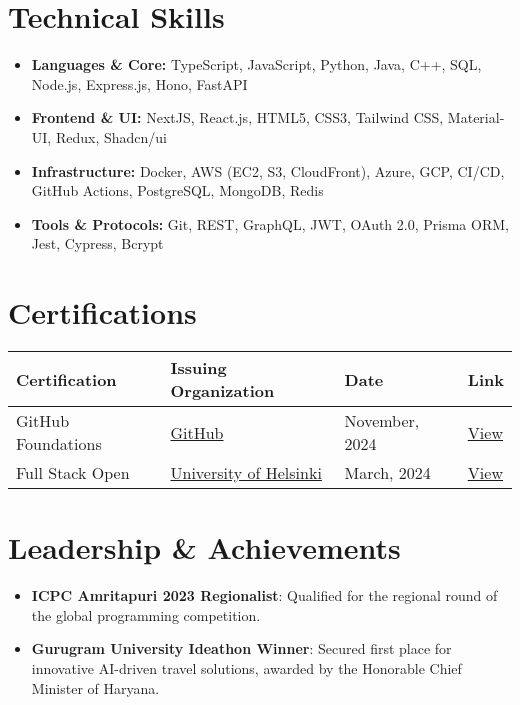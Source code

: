 \documentclass[letterpaper,11pt]{article}
\begin{document}
\section{Technical Skills}
\begin{itemize}[leftmargin=*,itemsep=0pt,parsep=0pt,topsep=0pt,partopsep=0pt]
	\item \textbf{Languages \& Core:} TypeScript, JavaScript, Python, Java, C++, SQL, Node.js, Express.js, Hono, FastAPI
	\item \textbf{Frontend \& UI:} NextJS, React.js, HTML5, CSS3, Tailwind CSS, Material-UI, Redux, Shadcn/ui
	\item \textbf{Infrastructure:} Docker, AWS (EC2, S3, CloudFront), Azure, GCP, CI/CD, GitHub Actions, PostgreSQL, MongoDB, Redis
	\item \textbf{Tools \& Protocols:} Git, REST, GraphQL, JWT, OAuth 2.0, Prisma ORM, Jest, Cypress, Bcrypt
\end{itemize}
\vspace{-6pt}

\section{Certifications}
\vspace{1pt}
\noindent
\renewcommand{\arraystretch}{1.3}
\setlength{\tabcolsep}{8pt}
\begin{tabularx}{\linewidth}{|X|X|X|X|}
	\hline
	\textbf{Certification} & \textbf{Issuing Organization} & \textbf{Date} & \textbf{Link} \\
	\hline
	GitHub Foundations & \href{https://github.com}{GitHub} & November, 2024 & \href{https://www.credly.com/badges/0d980c06-511c-4e3d-a9a7-9973688b34ad}{\underline{View}} \\
	\hline
	Full Stack Open & \href{https://www.helsinki.fi/en}{University of Helsinki} & March, 2024 & \href{https://github.com/Pulkitxm/fullstackopen/blob/main/Certificates/Pulkit\%20Pulkit.pdf}{\underline{View}} \\
	\hline
\end{tabularx}
\vspace{-6pt}

\section{Leadership \& Achievements}
\begin{itemize}[leftmargin=*,itemsep=0pt,parsep=0pt,topsep=0pt,partopsep=0pt]
	\item \textbf{ICPC Amritapuri 2023 Regionalist}: Qualified for the regional round of the global programming competition.
	\item \textbf{Gurugram University Ideathon Winner}: Secured first place for innovative AI-driven travel solutions, awarded by the Honorable Chief Minister of Haryana.
\end{itemize}
\end{document}
